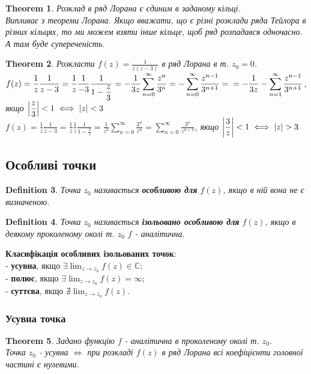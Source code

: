 \documentclass[a4paper, 10pt]{article}
\theoremstyle{theoremdd}
\newtheorem{theorem}{Theorem}[subsection]
\theoremstyle{theoremdd}
\newtheorem{definition}[theorem]{Definition}
\theoremstyle{theoremdd}
\theoremstyle{theoremdd}
\theoremstyle{theoremdd}
\theoremstyle{theoremdd}
\theoremstyle{theoremdd}
\theoremstyle{theoremdd}
\begin{document}
\begin{theorem}
Розклад в ряд Лорана є єдиним в заданому кільці.\\
\textit{Випливає з теореми Лорана. Якщо вважати, що є різні розклади ряда Тейлора в різних кільцях, то ми можем взяти інше кільце, щоб ряд розпадався одночасно. А там буде супереченість.}
\end{theorem}

\begin{theorem}
Розкласти $\displaystyle f(z)=\frac{1}{z(z-3)}$ в ряд Лорана в т. $z_0 = 0$.\\
	 $f(z) =  \displaystyle \frac{1}{z} \frac{1}{z-3} = \frac{1}{z} \frac{1}{-3} \frac{1}{1-\displaystyle\frac{z}{3}} = -\frac{1}{3z} \sum_{n=0}^{\infty} \frac{z^n}{3^n} = -\sum_{n=0}^{\infty} \frac{z^{n-1}}{3^{n+1}} = \\= -\frac{1}{3z} - \sum_{n=1}^{\infty} \frac{z^{n-1}}{3^{n+1}}$, якщо $\displaystyle \abs{\frac{z}{3}} <1 \iff \abs{z} < 3 $\\
	 $f(z) = \displaystyle \frac{1}{z} \frac{1}{z-3} = \frac{1}{z} \frac{1}{z} \frac{1}{1-\displaystyle\frac{3}{z}} = \frac{1}{z^2} \sum_{n=0}^{\infty} \frac{3^n}{z^n} = \sum_{n=0}^{\infty} \frac{3^n}{z^{n+2}}$, якщо $\displaystyle \abs{\frac{3}{z}}<1 \iff \abs{z}>3$
\end{theorem}
	 
\subsection{Особливі точки}
\begin{definition}
Точка $z_0$ називається \textbf{особливою для} $f(z)$, якщо в ній вона не є визначеною.
\end{definition}

\begin{definition}
Точка $z_0$ називається \textbf{ізольовано особливою для} $f(z)$, якщо в деякому проколеному околі т. $z_0$ $f$ - аналітична.
\end{definition}

\textbf{Класифікація особливих ізольованих точок}:\\
	 - \textbf{усувна}, якщо $\displaystyle\exists \lim_{z \to z_0} f(z) \in \mathbb{C}$;\\
	 - \textbf{полюс}, якщо $\displaystyle\exists \lim_{z \to z_0} f(z) = \infty$;\\
	 - \textbf{суттєва}, якщо $\displaystyle \nexists \lim_{z \to z_0} f(z)$.
	 
\subsubsection{Усувна точка}
\begin{theorem}
Задано функцію $f$ - аналітична в проколеному околі т. $z_0$.\\
Точка $z_0$ - усувна $\iff$ при розкладі $f(z)$ в ряд Лорана всі коефіцієнти головної частині є нулевими.
\end{theorem}
\end{document}
